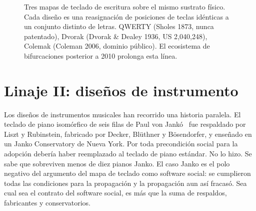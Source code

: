 \documentclass[10pt,letterpaper,twocolumn]{article}
\begin{document}
\begin{figure}[t]
\centering
{}
\caption{Tres mapas de teclado de escritura sobre el mismo sustrato físico. Cada diseño es una reasignación de posiciones de teclas idénticas a un conjunto distinto de letras. QWERTY (Sholes 1873, nunca patentado), Dvorak (Dvorak \& Dealey 1936, US 2{,}040{,}248), Colemak (Coleman 2006, dominio público). El ecosistema de bifurcaciones posterior a 2010 prolonga esta línea.}
\label{fig:typing-layouts}
\end{figure}

\section{Linaje II: diseños de instrumento}
\label{sec:lineage2}

Los diseños de instrumentos musicales han recorrido una historia paralela. El teclado de piano isomórfico de seis filas de Paul von Jankó~\citep{janko1882} fue respaldado por Liszt y Rubinstein, fabricado por Decker, Blüthner y Bösendorfer, y enseñado en un Janko Conservatory de Nueva York. Por toda precondición social para la adopción debería haber reemplazado al teclado de piano estándar. No lo hizo. Se sabe que sobreviven menos de diez pianos Janko. El caso Janko es el polo negativo del argumento del mapa de teclado como software social: se cumplieron todas las condiciones para la propagación y la propagación aun así fracasó. Sea cual sea el contrato del software social, es más que la suma de respaldos, fabricantes y conservatorios.
\end{document}
